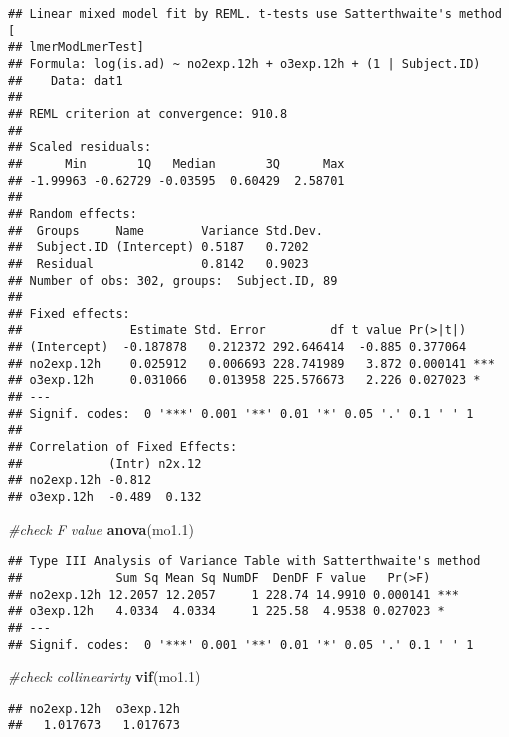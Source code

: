 \documentclass[12pt,]{article}
\newenvironment{Shaded}{\begin{snugshade}}{\end{snugshade}}
\newcommand{\CommentTok}[1]{\textcolor[rgb]{0.56,0.35,0.01}{\textit{#1}}}
\newcommand{\FloatTok}[1]{\textcolor[rgb]{0.00,0.00,0.81}{#1}}
\newcommand{\KeywordTok}[1]{\textcolor[rgb]{0.13,0.29,0.53}{\textbf{#1}}}
\newcommand{\NormalTok}[1]{#1}
\begin{document}
\begin{verbatim}
## Linear mixed model fit by REML. t-tests use Satterthwaite's method [
## lmerModLmerTest]
## Formula: log(is.ad) ~ no2exp.12h + o3exp.12h + (1 | Subject.ID)
##    Data: dat1
## 
## REML criterion at convergence: 910.8
## 
## Scaled residuals: 
##      Min       1Q   Median       3Q      Max 
## -1.99963 -0.62729 -0.03595  0.60429  2.58701 
## 
## Random effects:
##  Groups     Name        Variance Std.Dev.
##  Subject.ID (Intercept) 0.5187   0.7202  
##  Residual               0.8142   0.9023  
## Number of obs: 302, groups:  Subject.ID, 89
## 
## Fixed effects:
##               Estimate Std. Error         df t value Pr(>|t|)    
## (Intercept)  -0.187878   0.212372 292.646414  -0.885 0.377064    
## no2exp.12h    0.025912   0.006693 228.741989   3.872 0.000141 ***
## o3exp.12h     0.031066   0.013958 225.576673   2.226 0.027023 *  
## ---
## Signif. codes:  0 '***' 0.001 '**' 0.01 '*' 0.05 '.' 0.1 ' ' 1
## 
## Correlation of Fixed Effects:
##            (Intr) n2x.12
## no2exp.12h -0.812       
## o3exp.12h  -0.489  0.132
\end{verbatim}

\begin{Shaded}
\begin{Highlighting}[]
\CommentTok{#check F value}
\KeywordTok{anova}\NormalTok{(mo1}\FloatTok{.1}\NormalTok{)}
\end{Highlighting}
\end{Shaded}

\begin{verbatim}
## Type III Analysis of Variance Table with Satterthwaite's method
##             Sum Sq Mean Sq NumDF  DenDF F value   Pr(>F)    
## no2exp.12h 12.2057 12.2057     1 228.74 14.9910 0.000141 ***
## o3exp.12h   4.0334  4.0334     1 225.58  4.9538 0.027023 *  
## ---
## Signif. codes:  0 '***' 0.001 '**' 0.01 '*' 0.05 '.' 0.1 ' ' 1
\end{verbatim}

\begin{Shaded}
\begin{Highlighting}[]
\CommentTok{#check collinearirty}
\KeywordTok{vif}\NormalTok{(mo1}\FloatTok{.1}\NormalTok{)}
\end{Highlighting}
\end{Shaded}

\begin{verbatim}
## no2exp.12h  o3exp.12h 
##   1.017673   1.017673
\end{verbatim}
\end{document}
